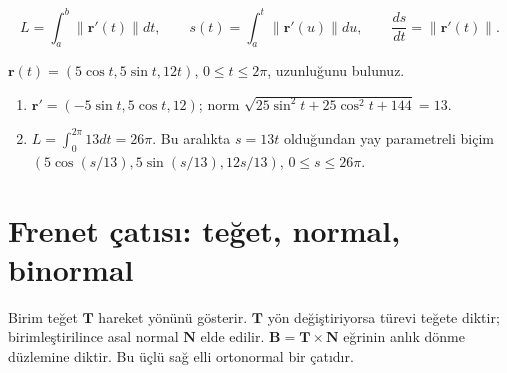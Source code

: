 {\small\[
L=\int_a^b\|\mathbf r\prime(t)\|dt,\qquad s(t)=\int_a^t\|\mathbf r\prime(u)\|du,\qquad\frac{ds}{dt}=\|\mathbf r\prime(t)\|.
\]}
\begin{tcolorbox}[title={Örnek 3.12 | Dersteki 5-12-13 helisi},colframe=accent]\(\mathbf r(t)=(5\cos t,5\sin t,12t)\), \(0\le t\le2\pi\), uzunluğunu bulunuz.
\par{}\end{tcolorbox}
\begin{tcolorbox}[title={Adım adım çözüm},colback=green!3!white,colframe=green]\begin{enumerate}
\item \(\mathbf r\prime=(-5\sin t,5\cos t,12)\); norm \(\sqrt{25\sin^2t+25\cos^2t+144}=13\).
\item \(L=\int_0^{2\pi}13dt=26\pi\). Bu aralıkta \(s=13t\) olduğundan yay parametreli biçim \((5\cos(s/13),5\sin(s/13),12s/13)\), \(0\le s\le26\pi\).
\end{enumerate}\end{tcolorbox}
\section{Frenet çatısı: teğet, normal, binormal}
Birim teğet \(\mathbf T\) hareket yönünü gösterir. \(\mathbf T\) yön değiştiriyorsa türevi teğete diktir; birimleştirilince asal normal \(\mathbf N\) elde edilir. \(\mathbf B=\mathbf T\times\mathbf N\) eğrinin anlık dönme düzlemine diktir. Bu üçlü sağ elli ortonormal bir çatıdır.


